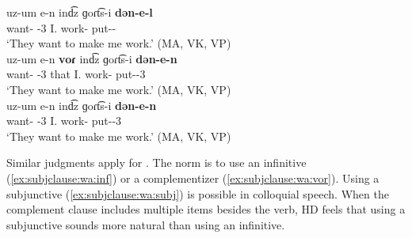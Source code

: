 \begin{exe}
	\ex  {{\seaSEA}}
	\begin{xlist}
		\ex  \gll   uz-um e-n ind͡z ɡoɾt͡s-i \textbf{dən-e-l} \\
		want-{\impfcvb} {\auxgloss}-3{\pl}  I.{\dat}   work-{\dat}  put-{\thgloss}-{\infgloss}  \\
		\trans `They want to make me work.'  \label{ex:subjclause:ea:inf} \hfill (MA, VK, VP) \\
		\ex  \gll   uz-um e-n \textbf{voɾ} ind͡z ɡoɾt͡s-i \textbf{dən-e-n} \\
		want-{\impfcvb} {\auxgloss}-3{\pl} that I.{\dat}   work-{\dat}  put-{\thgloss}-3{\pl}  \\
		\trans `They want to make me work.'   \label{ex:subjclause:ea:vor}  \hfill (MA, VK, VP) \\
		\ex  \gll   uz-um e-n ind͡z ɡoɾt͡s-i \textbf{dən-e-n} \\
		want-{\impfcvb} {\auxgloss}-3{\pl}  I.{\dat}   work-{\dat}  put-{\thgloss}-3{\pl}  \\
		\trans `They want to make me work.'  \label{ex:subjclause:ea:subj}  \hfill (MA, VK, VP) \\
	\end{xlist}
\end{exe}


Similar   judgments   apply for {\swaSWA}. The norm is to use an infinitive (\ref{ex:subjclause:wa:inf}) or a complementizer (\ref{ex:subjclause:wa:vor}). Using a subjunctive (\ref{ex:subjclause:wa:subj}) is possible in colloquial speech. When the complement clause includes multiple items besides the verb,   HD feels that using a subjunctive sounds more natural than using an infinitive. 

